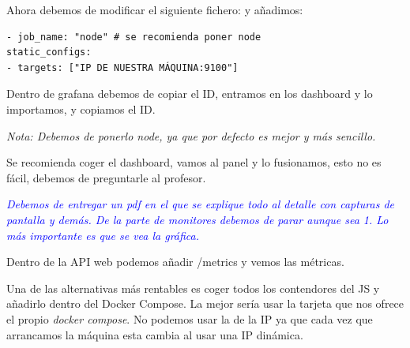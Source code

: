 Ahora debemos de modificar el siguiente fichero:  y añadimos: 

\begin{lstlisting}[style=yamlstyle]
  - job_name: "node" # se recomienda poner node
static_configs:
- targets: ["IP DE NUESTRA MÁQUINA:9100"]
\end{lstlisting}

Dentro de grafana debemos de copiar el ID, entramos en los dashboard y lo importamos, y copiamos el ID.

\textit{Nota: Debemos de ponerlo node, ya que por defecto es mejor y más sencillo.}

Se recomienda coger el dashboard, vamos al panel y lo fusionamos, esto no es fácil, debemos de preguntarle al profesor.

\textcolor{blue}{\textit{Debemos de entregar un pdf en el que se explique todo al detalle con capturas de pantalla y demás. De la parte de monitores debemos de parar aunque sea 1. Lo más importante es que se vea la gráfica.}}

Dentro de la API web podemos añadir /metrics y vemos las métricas.

Una de las alternativas más rentables es coger todos los contendores del JS y añadirlo dentro del Docker Compose. La mejor sería usar la tarjeta que nos ofrece el propio \textit{docker compose}. No podemos usar la de la IP ya que cada vez que arrancamos la máquina esta cambia al usar una IP dinámica.



